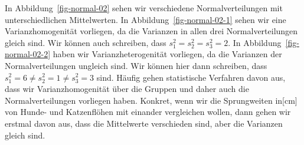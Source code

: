\documentclass[
  letterpaper,
]{scrbook}
\begin{document}
In Abbildung~\ref{fig-normal-02} sehen wir verschiedene
Normalverteilungen mit unterschiedlichen Mittelwerten. In
Abbildung~\ref{fig-normal-02-1} sehen wir eine Varianzhomogenität
vorliegen, da die Varianzen in allen drei Normalverteilungen gleich
sind. Wir können auch schreiben, dass
\(s^2_{1} = s^2_{2} = s^2_{3} = 2\). In Abbildung~\ref{fig-normal-02-2}
haben wir Varianzheterogenität vorliegen, da die Varianzen der
Normalverteilungen ungleich sind. Wir können hier dann schreiben, dass
\(s^2_{1} = 6 \neq s^2_{2} = 1 \neq s^2_{3} = 3\) sind. Häufig gehen
statistische Verfahren davon aus, dass wir Varianzhomogenität über die
Gruppen und daher auch die Normalverteilungen vorliegen haben. Konkret,
wenn wir die Sprungweiten in{[}cm{]} von Hunde- und Katzenflöhen mit
einander vergleichen wollen, dann gehen wir erstmal davon aus, dass die
Mittelwerte verschieden sind, aber die Varianzen gleich sind.
\end{document}
